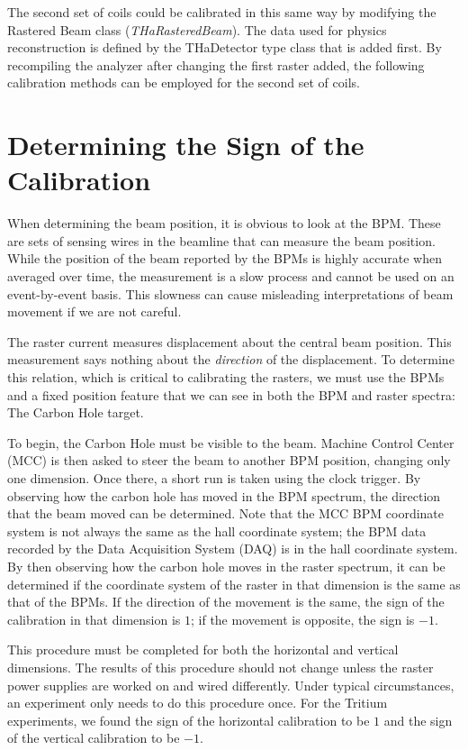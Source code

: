 The second set of coils could be calibrated in this same way by modifying the Rastered Beam class (\textit{THaRasteredBeam}). The data used for physics reconstruction is defined by the THaDetector type class that is added first. By recompiling the analyzer after changing the first raster added, the following calibration methods can be employed for the second set of coils.\cite{Gen}

\section{Determining the Sign of the Calibration}

When determining the beam position, it is obvious to look at the BPM. These are sets of sensing wires in the beamline that can measure the beam position. While the position of the beam reported by the BPMs is highly accurate when averaged over time, the measurement is a slow process and cannot be used on an event-by-event basis. This slowness can cause misleading interpretations of beam movement if we are not careful.

The raster current measures displacement about the central beam position. This measurement says nothing about the \textit{direction} of the displacement. To determine this relation, which is critical to calibrating the rasters, we must use the BPMs and a fixed position feature that we can see in both the BPM and raster spectra: The Carbon Hole target.

To begin, the Carbon Hole must be visible to the beam. Machine Control Center (MCC) is then asked to steer the beam to another BPM position, changing only one dimension. Once there, a short run is taken using the clock trigger. By observing how the carbon hole has moved in the BPM spectrum, the direction that the beam moved can be determined. Note that the MCC BPM coordinate system is not always the same as the hall coordinate system; the BPM data recorded by the Data Acquisition System (DAQ) is in the hall coordinate system. By then observing how the carbon hole moves in the raster spectrum, it can be determined if the coordinate system of the raster in that dimension is the same as that of the BPMs. If the direction of the movement is the same, the sign of the calibration in that dimension is $1$; if the movement is opposite, the sign is $-1$.

This procedure must be completed for both the horizontal and vertical dimensions. The results of this procedure should not change unless the raster power supplies are worked on and wired differently. Under typical circumstances, an experiment only needs to do this procedure once. For the Tritium experiments, we found the sign of the horizontal calibration to be $1$ and the sign of the vertical calibration to be $-1$.\cite{Dien}

